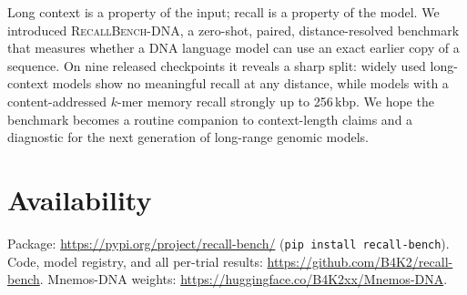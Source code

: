 Long context is a property of the input; recall is a property of the model. We introduced
\textsc{RecallBench-DNA}, a zero-shot, paired, distance-resolved benchmark that measures
whether a DNA language model can use an exact earlier copy of a sequence. On nine released
checkpoints it reveals a sharp split: widely used long-context models show no meaningful
recall at any distance, while models with a content-addressed $k$-mer memory recall strongly
up to 256\,kbp. We hope the benchmark becomes a routine companion to context-length claims
and a diagnostic for the next generation of long-range genomic models.

\section*{Availability}
Package: \url{https://pypi.org/project/recall-bench/} (\texttt{pip install recall-bench}).
Code, model registry, and all per-trial results:
\url{https://github.com/B4K2/recall-bench}. Mnemos-DNA weights:
\url{https://huggingface.co/B4K2xx/Mnemos-DNA}.
